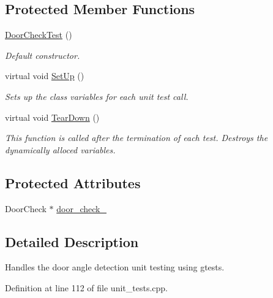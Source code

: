 \subsection*{Protected Member Functions}
\begin{DoxyCompactItemize}
\item 
\hyperlink{classDoorCheckTest_ac2102bef489397fdcfd5db89a985b17a}{Door\-Check\-Test} ()
\begin{DoxyCompactList}\small\item\em Default constructor. \end{DoxyCompactList}\item 
virtual void \hyperlink{classDoorCheckTest_af4cb81159a5a876d4c1523d4af01e4df}{Set\-Up} ()
\begin{DoxyCompactList}\small\item\em Sets up the class variables for each unit test call. \end{DoxyCompactList}\item 
virtual void \hyperlink{classDoorCheckTest_a9b6a89533b20489d34d914242164a46c}{Tear\-Down} ()
\begin{DoxyCompactList}\small\item\em This function is called after the termination of each test. Destroys the dynamically alloced variables. \end{DoxyCompactList}\end{DoxyCompactItemize}
\subsection*{Protected Attributes}
\begin{DoxyCompactItemize}
\item 
Door\-Check $\ast$ \hyperlink{classDoorCheckTest_a0837fac7e29727dfc7ddcea7dd37f8e1}{door\-\_\-check\-\_\-}
\end{DoxyCompactItemize}


\subsection{Detailed Description}
Handles the door angle detection unit testing using gtests. 

Definition at line 112 of file unit\-\_\-tests.\-cpp.



